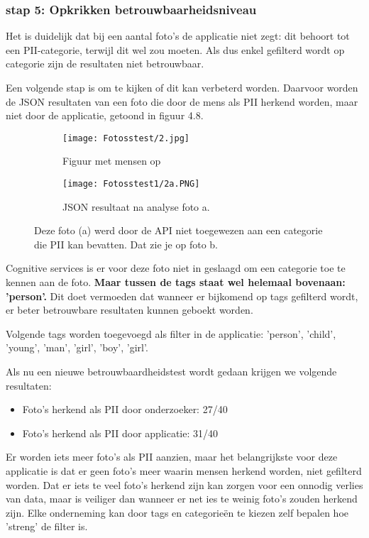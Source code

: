 \subsubsection{stap 5: Opkrikken betrouwbaarheidsniveau}
Het is duidelijk dat bij een aantal foto's de applicatie niet zegt: dit behoort tot een PII-categorie, terwijl dit wel zou moeten. Als dus enkel gefilterd wordt op categorie zijn de resultaten niet betrouwbaar.

Een volgende stap is om te kijken of dit kan verbeterd worden. Daarvoor worden de JSON resultaten van een foto die door de mens als PII herkend worden, maar niet door de applicatie, getoond in figuur 4.8. 

\begin{figure}[h]
	\centering
	\begin{subfigure}{0.45\textwidth}
		\centering
		\texttt{[image: Fotosstest/2.jpg]}
		\caption{Figuur met mensen op}
		\label{fig:qsdfqsdf}
	\end{subfigure}%
	\begin{subfigure}{0.45\textwidth}
		\centering
		\texttt{[image: Fotosstest1/2a.PNG]}
		\caption{JSON resultaat na analyse foto a.}
		\label{fig:sub2}
	\end{subfigure}
	\caption{Deze foto (a) werd door de API niet toegewezen aan een categorie die PII kan bevatten. Dat zie je op foto b.}
	\label{fig:teqsdfqsdfst}
\end{figure}

Cognitive services is er voor deze foto niet in geslaagd om een categorie toe te kennen aan de foto. \textbf{Maar tussen de tags staat wel helemaal bovenaan: 'person'.} Dit doet vermoeden dat wanneer er bijkomend op tags gefilterd wordt, er beter betrouwbare resultaten kunnen geboekt worden. 

Volgende tags worden toegevoegd als filter in de applicatie: 'person', 'child', 'young', 'man', 'girl', 'boy', 'girl'.

Als nu een nieuwe betrouwbaardheidstest wordt gedaan krijgen we volgende resultaten: 
\begin{itemize}
	\item Foto's herkend als PII door onderzoeker: 27/40
	\item Foto's herkend als PII door applicatie: 31/40
\end{itemize}

Er worden iets meer foto's als PII aanzien, maar het belangrijkste voor deze applicatie is dat er geen foto's meer waarin mensen herkend worden, niet gefilterd worden. 
Dat er iets te veel foto's herkend zijn kan zorgen voor een onnodig verlies van data, maar is veiliger dan wanneer er net ies te weinig foto's zouden herkend zijn. Elke onderneming kan door tags en categorieën te kiezen zelf bepalen hoe 'streng' de filter is. 


